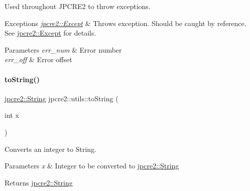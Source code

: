 Used throughout J\+P\+C\+R\+E2 to throw exceptions. 


\begin{DoxyExceptions}{Exceptions}
{\em \hyperlink{classjpcre2_1_1Except}{jpcre2\+::\+Except}} & Throws exception. Should be caught by reference. See \hyperlink{classjpcre2_1_1Except}{jpcre2\+::\+Except} for details. \\
\hline
\end{DoxyExceptions}

\begin{DoxyParams}{Parameters}
{\em err\+\_\+num} & Error number \\
\hline
{\em err\+\_\+off} & Error offset \\
\hline
\end{DoxyParams}
\hypertarget{namespacejpcre2_1_1utils_a3603a3493202e7408e18fd0a912bf725_a3603a3493202e7408e18fd0a912bf725}{}\label{namespacejpcre2_1_1utils_a3603a3493202e7408e18fd0a912bf725_a3603a3493202e7408e18fd0a912bf725} 
\paragraph{\texorpdfstring{to\+String()}{toString()}\hspace{0.1cm}{\footnotesize\ttfamily [1/4]}}
{\footnotesize\ttfamily \hyperlink{namespacejpcre2_a91f03070152fb228bc116c5a737f1d16}{jpcre2\+::\+String} jpcre2\+::utils\+::to\+String (\begin{DoxyParamCaption}\item[{int}]{x }\end{DoxyParamCaption})}



Converts an integer to String. 


\begin{DoxyParams}{Parameters}
{\em x} & Integer to be converted to \hyperlink{namespacejpcre2_a91f03070152fb228bc116c5a737f1d16}{jpcre2\+::\+String} \\
\hline
\end{DoxyParams}
\begin{DoxyReturn}{Returns}
\hyperlink{namespacejpcre2_a91f03070152fb228bc116c5a737f1d16}{jpcre2\+::\+String} 
\end{DoxyReturn}
\hypertarget{namespacejpcre2_1_1utils_a917512161b56047d6ef240bdba2ac212_a917512161b56047d6ef240bdba2ac212}{}\label{namespacejpcre2_1_1utils_a917512161b56047d6ef240bdba2ac212_a917512161b56047d6ef240bdba2ac212} 
